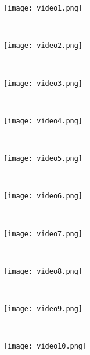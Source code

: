 \begin{figure}[!htbp]
\captionsetup[subfigure]{position=b}
    \centering
    \begin{subfigure}[t]{0.2\textwidth}
        \texttt{[image: video1.png]}
          \caption{}
          \label{fig:video:a}
    \end{subfigure}
    ~
    \begin{subfigure}[t]{0.2\textwidth}
        \texttt{[image: video2.png]}                                          \caption{}
    \end{subfigure}
    ~
    \begin{subfigure}[t]{0.2\textwidth}
        \texttt{[image: video3.png]}
        \caption{}
        \label{fig:video:c}
    \end{subfigure}
    ~
    \begin{subfigure}[t]{0.2\textwidth}
        \texttt{[image: video4.png]}
        \caption{}
        \label{fig:video:d}
    \end{subfigure}
    ~
    \begin{subfigure}[t]{0.2\textwidth}
        \texttt{[image: video5.png]}
        \caption{}
        \label{fig:video:e}
    \end{subfigure}
    ~
    \begin{subfigure}[t]{0.2\textwidth}
        \texttt{[image: video6.png]}
        \caption{}
        \label{fig:video:f}
    \end{subfigure}
    ~
    \begin{subfigure}[t]{0.2\textwidth}
        \texttt{[image: video7.png]}
        \caption{}
        \label{fig:video:g}
    \end{subfigure}
    ~
    \begin{subfigure}[t]{0.2\textwidth}
        \texttt{[image: video8.png]}
        \caption{}
        \label{fig:video:h}
    \end{subfigure}
    ~
    \begin{subfigure}[t]{0.2\textwidth}
        \texttt{[image: video9.png]}
        \caption{}    
        \label{fig:video:i}
    \end{subfigure}
    ~
    \begin{subfigure}[t]{0.2\textwidth}
        \texttt{[image: video10.png]}
        \caption{}    
        \label{fig:video:j}
    \end{subfigure}

\end{figure}
